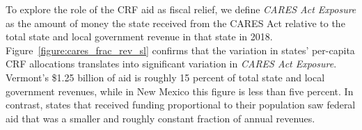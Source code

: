 To explore the role of the CRF aid as fiscal relief, we define \emph{CARES Act Exposure} as the amount of money the state received from the CARES Act relative to the total state and local government revenue in that state in 2018. Figure~\ref{figure:cares_frac_rev_sl} confirms that the variation in states' per-capita CRF allocations translates into significant variation in \emph{CARES Act Exposure}. Vermont's \$1.25 billion of aid is roughly 15 percent of total state and local government revenues, while in New Mexico this figure is less than five percent. In contrast, states that received funding proportional to their population saw federal aid that was a smaller and roughly constant fraction of annual revenues. 


